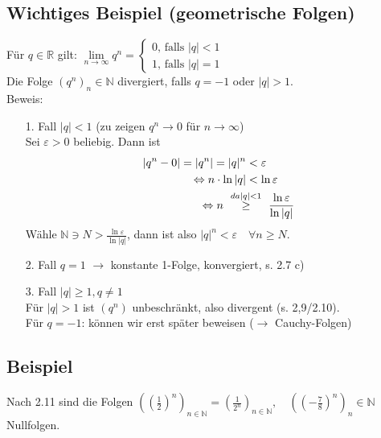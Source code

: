 \documentclass[12pt, titlepage]{article}
\newcommand{\R}{\mathds{R}}
\newcommand{\N}{\mathds{N}}
\newcommand{\infn}{n\rightarrow\infty}
\renewcommand{\>}{\rightarrow}
\renewcommand{\*}{\cdot}
\renewcommand{\epsilon}{\varepsilon}
\begin{document}
	\subsection{Wichtiges Beispiel (geometrische Folgen)}
	Für $q\in\R$ gilt: 
	$\lim\limits_{\infn}q^n=\begin{cases}
	0\textrm{, falls }|q|<1\\
	1\textrm{, falls }|q|=1
	\end{cases}$\\
	Die Folge $(q^n)_n\in\N$ divergiert, falls $q=-1$ oder $|q|>1$.\\
	Beweis: \begin{itemize}
		\item[1. Fall] $|q|<1$ (zu zeigen $q^n\> 0$ für $\infn$)\\
		Sei $\epsilon>0$ beliebig. Dann ist
		\begin{align*}
			|q^n-0|=|q^n|=|q|^n&<\epsilon\\
			\Leftrightarrow n\*\ln|q|&<\ln\epsilon\\
			\Leftrightarrow n \qquad &\mathclap{\overset{da |q|<1}{\geq}}\qquad \frac{\ln\epsilon}{\ln|q|}
		\end{align*}
		Wähle $\N\ni N>\frac{\ln\epsilon}{\ln|q|}$, dann ist also $|q|^n<\epsilon\quad\forall n\geq N$.
		\item[2. Fall] $q=1$ $\>$ konstante 1-Folge, konvergiert, s. 2.7 c)
		\item[3. Fall] $|q|\geq 1, q\neq 1$\\
		Für $|q|>1$ ist $(q^n)$ unbeschränkt, also divergent (s. 2,9/2.10).\\
		Für $q=-1$: können wir erst später beweisen ($\>$ Cauchy-Folgen)
	\end{itemize}
	\subsection{Beispiel}
	Nach 2.11 sind die Folgen $((\frac{1}{2})^n)_{n\in\N}=(\frac{1}{2^n})_{n\in\N},\quad ((-\frac{7}{8})^n)_n\in\N$ Nullfolgen.
\end{document}
